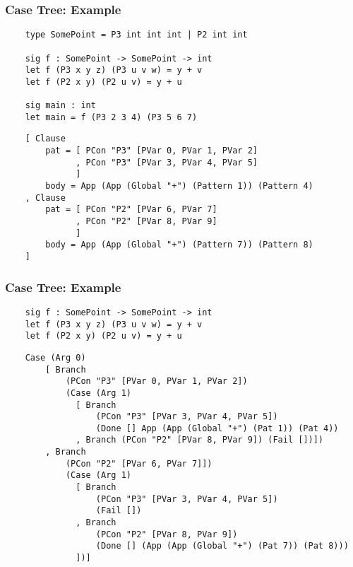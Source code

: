 \documentclass[10pt, xelatex, hyperref={pdfpagelabels=false,breaklinks}]{beamer}
\begin{document}
\begin{frame}[fragile]
  \frametitle{Case Tree: Example}

  \begin{verbatim}
    type SomePoint = P3 int int int | P2 int int 

    sig f : SomePoint -> SomePoint -> int
    let f (P3 x y z) (P3 u v w) = y + v
    let f (P2 x y) (P2 u v) = y + u

    sig main : int
    let main = f (P3 2 3 4) (P3 5 6 7)
  \end{verbatim}


  \begin{verbatim}
    [ Clause
        pat = [ PCon "P3" [PVar 0, PVar 1, PVar 2]
              , PCon "P3" [PVar 3, PVar 4, PVar 5]
              ]
        body = App (App (Global "+") (Pattern 1)) (Pattern 4) 
    , Clause
        pat = [ PCon "P2" [PVar 6, PVar 7]
              , PCon "P2" [PVar 8, PVar 9]
              ]
        body = App (App (Global "+") (Pattern 7)) (Pattern 8)
    ]
  \end{verbatim}
\end{frame}

\begin{frame}[fragile]
  \frametitle{Case Tree: Example}

  \begin{verbatim}
    sig f : SomePoint -> SomePoint -> int
    let f (P3 x y z) (P3 u v w) = y + v
    let f (P2 x y) (P2 u v) = y + u
  \end{verbatim}

  \begin{verbatim}
    Case (Arg 0) 
        [ Branch 
            (PCon "P3" [PVar 0, PVar 1, PVar 2])
            (Case (Arg 1)
              [ Branch
                  (PCon "P3" [PVar 3, PVar 4, PVar 5])
                  (Done [] App (App (Global "+") (Pat 1)) (Pat 4))
              , Branch (PCon "P2" [PVar 8, PVar 9]) (Fail [])])
        , Branch 
            (PCon "P2" [PVar 6, PVar 7]])
            (Case (Arg 1)
              [ Branch
                  (PCon "P3" [PVar 3, PVar 4, PVar 5])
                  (Fail [])
              , Branch
                  (PCon "P2" [PVar 8, PVar 9])
                  (Done [] (App (App (Global "+") (Pat 7)) (Pat 8)))
              ])]
  \end{verbatim}
\end{frame}
\end{document}
